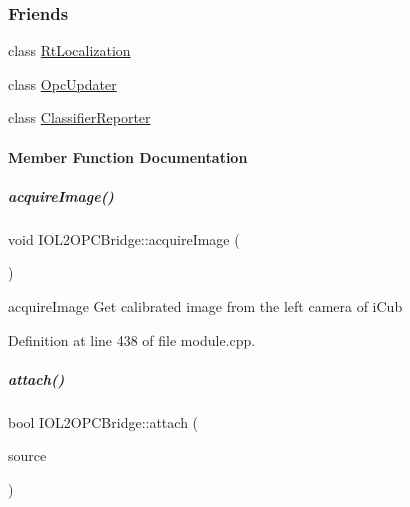 \subsubsection*{Friends}
\begin{DoxyCompactItemize}
\item 
class \hyperlink{group__iol2opc_a07428251e180710afce1c377e6391901}{Rt\+Localization}
\item 
class \hyperlink{group__iol2opc_a175c6756cab94a7f341e39e979d422e2}{Opc\+Updater}
\item 
class \hyperlink{group__iol2opc_a2d65ad1e24770ec65134e5ed6b45b8a4}{Classifier\+Reporter}
\end{DoxyCompactItemize}


\paragraph{Member Function Documentation}
\mbox{\label{group__iol2opc_a798175bdeb57a13150a7d7d1ae9b1fd3}} 
\subparagraph{\texorpdfstring{acquire\+Image()}{acquireImage()}}
{\footnotesize\ttfamily void I\+O\+L2\+O\+P\+C\+Bridge\+::acquire\+Image (\begin{DoxyParamCaption}{ }\end{DoxyParamCaption})\hspace{0.3cm}{\ttfamily [protected]}}



acquire\+Image Get calibrated image from the left camera of i\+Cub 



Definition at line 438 of file module.\+cpp.

\mbox{\label{group__iol2opc_af569c67872e76a8e9cfa765f30ec8e06}} 
\subparagraph{\texorpdfstring{attach()}{attach()}}
{\footnotesize\ttfamily bool I\+O\+L2\+O\+P\+C\+Bridge\+::attach (\begin{DoxyParamCaption}\item[{Rpc\+Server \&}]{source }\end{DoxyParamCaption})\hspace{0.3cm}{\ttfamily [protected]}}



